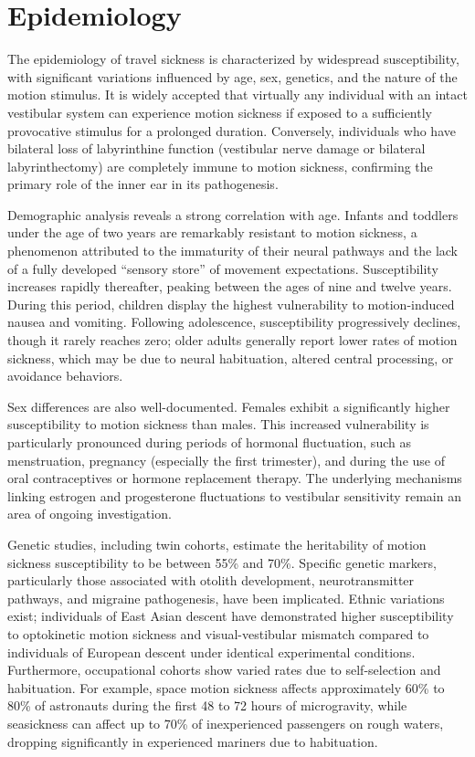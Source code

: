 \section*{Epidemiology}
The epidemiology of travel sickness is characterized by widespread susceptibility, with significant variations influenced by age, sex, genetics, and the nature of the motion stimulus. It is widely accepted that virtually any individual with an intact vestibular system can experience motion sickness if exposed to a sufficiently provocative stimulus for a prolonged duration. Conversely, individuals who have bilateral loss of labyrinthine function (vestibular nerve damage or bilateral labyrinthectomy) are completely immune to motion sickness, confirming the primary role of the inner ear in its pathogenesis.

Demographic analysis reveals a strong correlation with age. Infants and toddlers under the age of two years are remarkably resistant to motion sickness, a phenomenon attributed to the immaturity of their neural pathways and the lack of a fully developed ``sensory store'' of movement expectations. Susceptibility increases rapidly thereafter, peaking between the ages of nine and twelve years. During this period, children display the highest vulnerability to motion-induced nausea and vomiting. Following adolescence, susceptibility progressively declines, though it rarely reaches zero; older adults generally report lower rates of motion sickness, which may be due to neural habituation, altered central processing, or avoidance behaviors.

Sex differences are also well-documented. Females exhibit a significantly higher susceptibility to motion sickness than males. This increased vulnerability is particularly pronounced during periods of hormonal fluctuation, such as menstruation, pregnancy (especially the first trimester), and during the use of oral contraceptives or hormone replacement therapy. The underlying mechanisms linking estrogen and progesterone fluctuations to vestibular sensitivity remain an area of ongoing investigation.

Genetic studies, including twin cohorts, estimate the heritability of motion sickness susceptibility to be between 55\% and 70\%. Specific genetic markers, particularly those associated with otolith development, neurotransmitter pathways, and migraine pathogenesis, have been implicated. Ethnic variations exist; individuals of East Asian descent have demonstrated higher susceptibility to optokinetic motion sickness and visual-vestibular mismatch compared to individuals of European descent under identical experimental conditions. Furthermore, occupational cohorts show varied rates due to self-selection and habituation. For example, space motion sickness affects approximately 60\% to 80\% of astronauts during the first 48 to 72 hours of microgravity, while seasickness can affect up to 70\% of inexperienced passengers on rough waters, dropping significantly in experienced mariners due to habituation.

